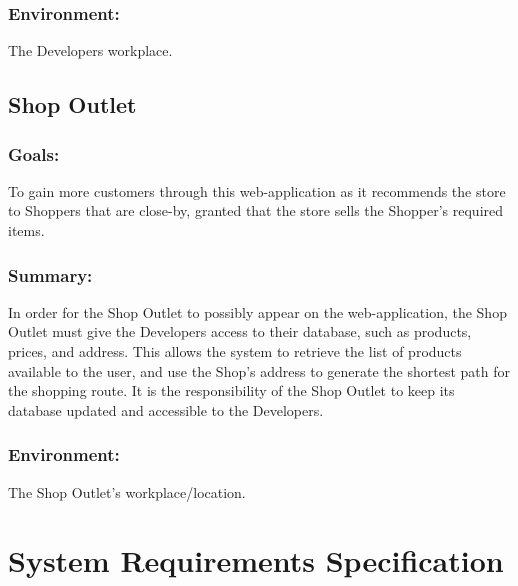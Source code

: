 \documentclass[12pt]{article}
\begin{document}
\subsubsection{Environment:}
The Developers workplace.
\subsection{Shop Outlet}
\subsubsection{Goals:}
To gain more customers through this web-application as it recommends the store to Shoppers that
are close-by, granted that the store sells the Shopper’s required items.
\subsubsection{Summary:}
In order for the Shop Outlet to possibly appear on the web-application, the Shop Outlet must give
the Developers access to their database, such as products, prices, and address. This allows the
system to retrieve the list of products available to the user, and use the Shop’s address to generate
the shortest path for the shopping route. It is the responsibility of the Shop Outlet to keep its
database updated and accessible to the Developers.
\subsubsection{Environment:}
The Shop Outlet’s workplace/location.

 \section{System Requirements Specification}
\end{document}

